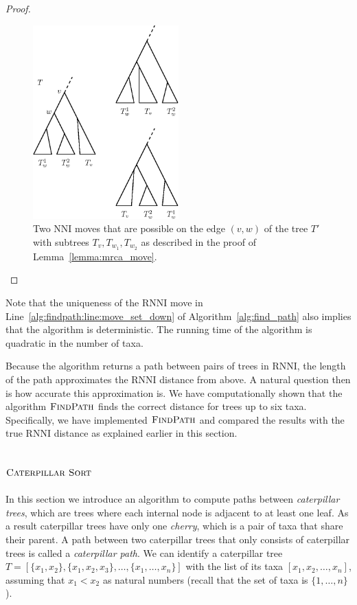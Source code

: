 \documentclass{amsart}
\newcommand{\nni}{\mathrm{NNI}}
\newcommand{\rnni}{\mathrm{RNNI}}
\newcommand{\csort}{\textsc{Caterpillar Sort}}
\newcommand{\findpath}{\textsc{FindPath}}
\begin{document}
\begin{proof}
\begin{figure}[H]
\centering
\includegraphics[width=0.5\textwidth]{mrca_move}
\vspace{12pt}
\caption{Two $\nni$ moves that are possible on the edge $(v,w)$ of the tree $T'$ with subtrees $T_v, T_{w_1}, T_{w_2}$ as described in the proof of Lemma~\ref{lemma:mrca_move}.}
\label{fig:mrca_move}
\end{figure}
\end{proof}

Note that the uniqueness of the $\rnni$ move in Line~\ref{alg:findpath:line:move_set_down} of Algorithm~\ref{alg:find_path} also implies that the algorithm is deterministic.
The running time of the algorithm is quadratic in the number of taxa.

Because the algorithm returns a path between pairs of trees in $\rnni$, the length of the path approximates the $\rnni$ distance from above.
A natural question then is how accurate this approximation is.
We have computationally shown that the algorithm $\findpath$ finds the correct distance for trees up to six taxa.
Specifically, we have implemented $\findpath$
\autocite{}
and compared the results with the true $\rnni$ distance as explained earlier in this section.


\subsection{$\csort$}
\label{section:alg_csort}

In this section we introduce an algorithm to compute paths between \emph{caterpillar trees}, which are trees where each internal node is adjacent to at least one leaf.
As a result caterpillar trees have only one \emph{cherry}, which is a pair of taxa that share their parent.
A path between two caterpillar trees that only consists of caterpillar trees is called a \emph{caterpillar path}.
We can identify a caterpillar tree $T = [\{x_1, x_2\}, \{x_1, x_2, x_3\}, \ldots, \{x_1, \ldots, x_n\}]$ with the list of its taxa $[x_1, x_2, \ldots, x_n]$, assuming that $x_1 < x_2$ as natural numbers (recall that the set of taxa is $\{1, \ldots, n\}$).
\end{document}
